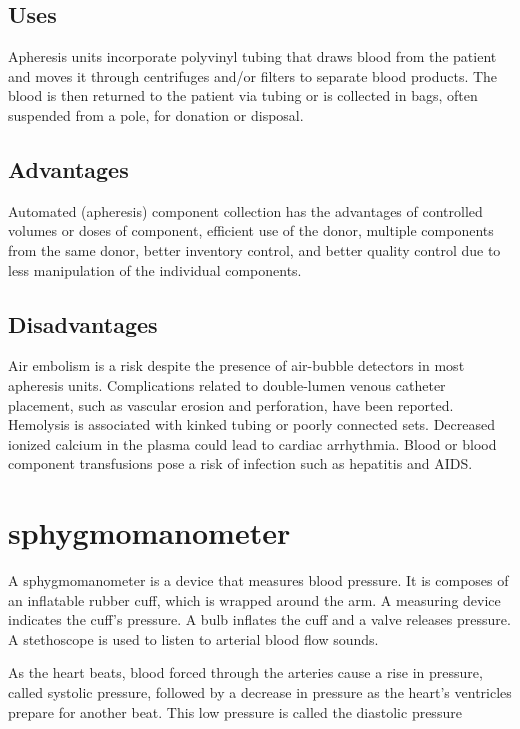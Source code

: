 \documentclass[12pt]{article}
\begin{document}
\subsection{Uses}

Apheresis units incorporate polyvinyl tubing that draws blood from the patient and moves it through centrifuges and/or filters to separate blood products. The blood is then returned to the patient via tubing or is collected in bags, often suspended from a pole, for donation or disposal.

\subsection{Advantages}

Automated (apheresis) component collection has the advantages of controlled volumes or doses of component, efficient use of the donor, multiple components from the same donor, better inventory control, and better quality control due to less manipulation of the individual components.

\subsection{Disadvantages}

Air embolism is a risk despite the presence of air-bubble detectors
in most apheresis units. Complications related to double-lumen
venous catheter placement, such as vascular erosion and
perforation, have been reported. Hemolysis
is associated with kinked tubing or poorly
connected sets. Decreased ionized calcium in
the plasma could lead to cardiac arrhythmia.
Blood or blood component transfusions pose
a risk of infection such as hepatitis and AIDS.
\clearpage
\section{sphygmomanometer}

A sphygmomanometer is a device that measures blood pressure. It is composes of an inflatable rubber cuff, which is wrapped around the arm. A measuring device indicates the cuff's pressure. A bulb inflates the cuff and a valve releases pressure. A stethoscope is used to listen to arterial blood flow sounds.

As the heart beats, blood forced through the arteries cause a rise in pressure, called systolic pressure, followed by a decrease in pressure as the heart's ventricles prepare for another beat. This low pressure is called the diastolic pressure
\end{document}
